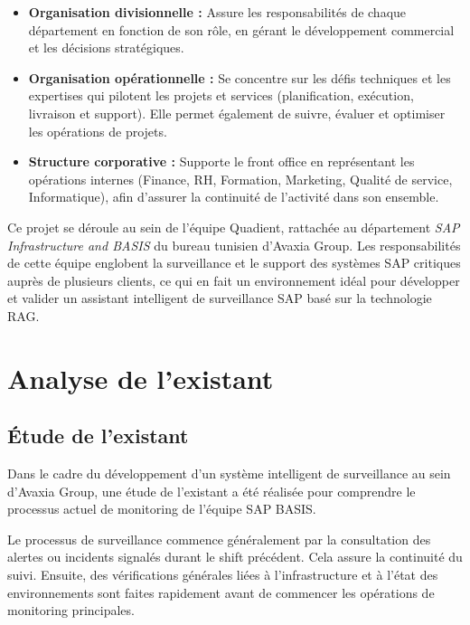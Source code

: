 \begin{itemize}[leftmargin=*, label=\textbullet]
  \item \textbf{Organisation divisionnelle :} Assure les responsabilités de chaque
        département en fonction de son rôle, en gérant le développement commercial et les
        décisions stratégiques.
  \item \textbf{Organisation opérationnelle :} Se concentre sur les défis techniques et
        les expertises qui pilotent les projets et services (planification, exécution,
        livraison et support). Elle permet également de suivre, évaluer et optimiser les
        opérations de projets.
  \item \textbf{Structure corporative :} Supporte le front office en représentant les
        opérations internes (Finance, RH, Formation, Marketing, Qualité de service,
        Informatique), afin d'assurer la continuité de l'activité dans son ensemble.
\end{itemize}

Ce projet se déroule au sein de l'équipe Quadient, rattachée au département
\textit{SAP Infrastructure and BASIS} du bureau tunisien d'Avaxia Group. Les
responsabilités de cette équipe englobent la surveillance et le support des systèmes SAP
critiques auprès de plusieurs clients, ce qui en fait un environnement idéal pour
développer et valider un assistant intelligent de surveillance SAP basé sur la technologie
RAG.

\section{Analyse de l'existant}
\label{sec:existant}
\subsection{Étude de l'existant}

Dans le cadre du développement d'un système intelligent de surveillance au sein d'Avaxia Group, une étude de l'existant a été réalisée pour comprendre le processus actuel de monitoring de l'équipe SAP BASIS.

Le processus de surveillance commence généralement par la consultation des alertes ou incidents signalés durant le shift précédent. Cela assure la continuité du suivi. Ensuite, des vérifications générales liées à l'infrastructure et à l'état des environnements sont faites rapidement avant de commencer les opérations de monitoring principales.

